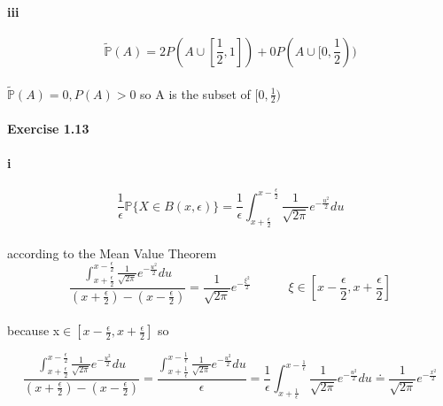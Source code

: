 \documentclass{article}
\begin{document}
{\paragraph{iii}{}
\begin{displaymath}
   \tilde{\mathbb{P}}(A)=2P(A\cup[\frac{1}{2},1])+0P(A\cup[0,\frac{1}{2}))
\end{displaymath}
\paragraph{}{$ \tilde{\mathbb{P}}(A)=0,P(A)>0$ so A is the subset of $[0,\frac{1}{2})$}

\paragraph{Exercise 1.13}
\paragraph{i}
\begin{displaymath}
  \frac{1}{\epsilon}\mathbb{P}\{X\in B(x,\epsilon)\}=\frac{1}{\epsilon}\int_{x+\frac{\epsilon }{2}}^{x-\frac{\epsilon}{2}}\frac{1}{\sqrt{2\pi}}e^{-\frac{u^{2}}{2}}du
\end{displaymath}
\paragraph{}{according to the Mean Value Theorem}
\begin{displaymath}
  \frac{\int_{x+\frac{\epsilon}{2}}^{x-\frac{\epsilon }{2}}\frac{1}{\sqrt{2\pi}}e^{-\frac{u^{2}}{2}}du}{(x+\frac{\epsilon }{2})-(x-\frac{\epsilon }{2})}
  =\frac{1}{\sqrt{2\pi}}e^{-\frac{\xi^{2}}{2}}\quad\quad\quad \xi \in [x-\frac{\epsilon }{2},x+\frac{\epsilon }{2}]
\end{displaymath}
\paragraph{}{because x$\in [x-\frac{\epsilon}{2},x+\frac{\epsilon}{2}]$ \quad\quad\quad so}

\begin{displaymath}
   \frac{\int_{x+\frac{\epsilon}{2}}^{x-\frac{\epsilon}{2}}\frac{1}{\sqrt{2\pi}}e^{-\frac{u^{2}}{2}}du}{(x+\frac{\epsilon}{2})-(x-\frac{\epsilon }{2})}=
   \frac{\int_{x+\frac{1}{\epsilon}}^{x-\frac{1}{\epsilon}}\frac{1}{\sqrt{2\pi}}e^{-\frac{u^{2}}{2}}du}{\epsilon}
   =\frac{1}{\epsilon}\int_{x+\frac{1}{\epsilon}}^{x-\frac{1}{\epsilon}}\frac{1}{\sqrt{2\pi}}e^{-\frac{u^{2}}{2}}du\doteq\frac{1}{\sqrt{2\pi}}e^{-\frac{x^{2}}{2}}
\end{displaymath}
}
\end{document}
